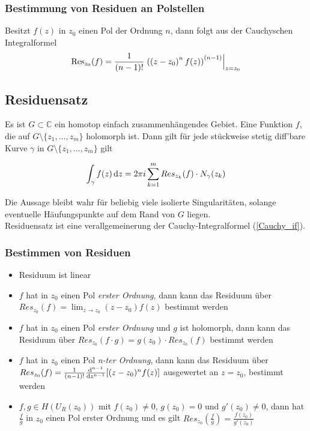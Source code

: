 \subsubsection{Bestimmung von Residuen an Polstellen}
Besitzt $f(z)$ in $z_0$ einen Pol der Ordnung $n$, dann folgt aus der Cauchyschen Integralformel
\begin{equation*}
    \text{Res}_{z_0}(f)=\frac{1}{(n-1)!}\left.\left(\left(z-z_0\right)^nf(z)\right)^{(n-1)}\right|_{z=z_0}
\end{equation*}

\subsection{Residuensatz}
Es ist $G\subset \mathbb{C}$ ein homotop einfach zusammenhängendes Gebiet. Eine Funktion $f$, die auf $G\setminus\{z_1,\dots,z_m\}$ holomorph ist. Dann gilt für jede stückweise stetig diff'bare Kurve $\gamma$ in $G\setminus\{z_1,\dots,z_m\}$ gilt

\begin{equation*}
    \int_{\gamma}f(z)\mathop{}\!\mathrm{d} z = 2\pi i \sum_{k=1}^{m}Res_{z_k}(f) \cdot N_{\gamma}(z_k)
\end{equation*}

Die Aussage bleibt wahr für beliebig viele isolierte Singularitäten, solange eventuelle Häufungspunkte auf dem Rand von $G$ liegen.\\
\noindent Residuensatz ist eine verallgemeinerung der Cauchy-Integralformel (\ref{Cauchy_if}).


\subsubsection{Bestimmen von Residuen}
\begin{itemize}
    \item Residuum ist linear
    \item $f$ hat in $z_0$ einen Pol \textit{erster Ordnung}, dann kann das Residuum über $Res_{z_0}(f) = \lim_{z \to z_0}(z-z_0)f(z)$ bestimmt werden 
    \item $f$ hat in $z_0$ einen Pol \textit{erster Ordnung} und $g$ ist holomorph, dann kann das Residuum über $Res_{z_0}(f\cdot g) = g(z_0)\cdot Res_{z_0}(f)$ bestimmt werden
    \item $f$ hat in $z_0$ einen Pol \textit{n-ter Ordnung}, dann kann das Residuum über $Res_{z_0}(f) = \frac{1}{(n-1)!}\frac{\mathop{}\!\mathrm{d}^{n-1}}{\mathop{}\!\mathrm{d} z^{n-1}}[(z-z_0)^nf(z)]$ ausgewertet an $z=z_0$, bestimmt werden
    \item $f,g \in H(U_R(z_0))$ mit $f(z_0)\neq 0$, $g(z_0)=0$ und $g'(z_0)\neq 0$, dann hat $\frac{f}{g}$ in $z_0$ einen Pol erster Ordnung und es gilt $Res_{z_0}(\frac{f}{g})=\frac{f(z_0)}{g'(z_0)}$
\end{itemize}

